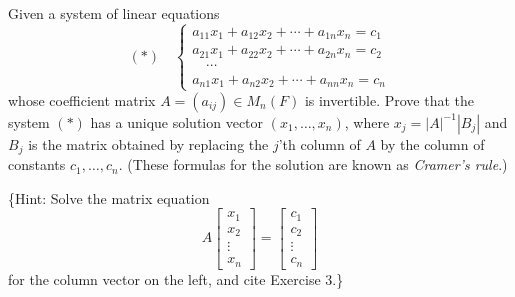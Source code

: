 \begin{tcolorbox}[title=Problem 4, breakable]
Given a system of linear equations
\[
(*) \quad \begin{cases}
a_{11}x_1 + a_{12}x_2 + \cdots + a_{1n}x_n = c_1 \\
a_{21}x_1 + a_{22}x_2 + \cdots + a_{2n}x_n = c_2 \\
\quad \cdots \\
a_{n1}x_1 + a_{n2}x_2 + \cdots + a_{nn}x_n = c_n
\end{cases}
\]
whose coefficient matrix $A = (a_{ij}) \in M_n(F)$ is invertible. Prove that the system $(*)$ has a unique solution vector $(x_1, \ldots, x_n)$, where $x_j = |A|^{-1}|B_j|$ and $B_j$ is the matrix obtained by replacing the $j$'th column of $A$ by the column of constants $c_1, \ldots, c_n$. (These formulas for the solution are known as \emph{Cramer's rule}.)

\{Hint: Solve the matrix equation
\[
A \begin{bmatrix} x_1 \\ x_2 \\ \vdots \\ x_n \end{bmatrix} = \begin{bmatrix} c_1 \\ c_2 \\ \vdots \\ c_n \end{bmatrix}
\]
for the column vector on the left, and cite Exercise 3.\}
\end{tcolorbox}


